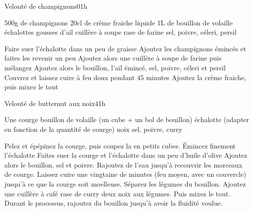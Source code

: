 \begin{recette}{Velouté de champignons}{0}{1h}{}
\begin{ingredients}
\ingredient 500g de champignons
\ingredient 20cl de crème fraiche liquide
\ingredient 1L de bouillon de volaille
 échalottes
 gousses d'ail
 cuillère à soupe rase de farine
\ingredient sel, poivre, céleri, persil
\end{ingredients}

\begin{preparation}
\etape Faire suer l'échalotte dans un peu de graisse
\etape Ajoutez les champignons émincés et faites les revenir un peu
\etape Ajoutez alors une cuillère à soupe de farine puis mélangez
\etape Ajoutez alors le bouillon, l'ail émincé, sel, poivre, céleri et persil
\etape Couvrez et laissez cuire à feu doux pendant 45 minutes
\etape Ajoutez la crème fraiche, puis mixez le tout
\end{preparation}
\end{recette}

\begin{recette}{Velouté de butternut aux noix}{4}{1h}{}
\begin{ingredients}
\ingredient Une courge
\ingredient bouillon de volaille (un cube + un bol de bouillon)
 échalotte (adapter en fonction de la quantité de courge)
 noix
\ingredient sel, poivre, curry
\end{ingredients}

\begin{preparation}
\etape Pelez et épépinez la courge, puis coupez la en petits cubes. Émincez finement l'échalotte
\etape Faites suer la courge et l'échalotte dans un peu d'huile d'olive
\etape Ajoutez alors le bouillon, sel et poivre. Rajoutez de l'eau jusqu'à recouvrir les morceaux de courge. 
\etape Laissez cuire 
une vingtaine de minutes (feu moyen, avec un couvercle) jusqu'à ce que la courge soit moelleuse.
\etape Séparez les légumes du bouillon. 
\etape Ajoutez une cuillère à café rase de curry deux noix aux légumes. Puis mixez le tout. Durant le processus, rajoutez du 
bouillon jusqu'à avoir la fluidité voulue.
\end{preparation}
\end{recette}

